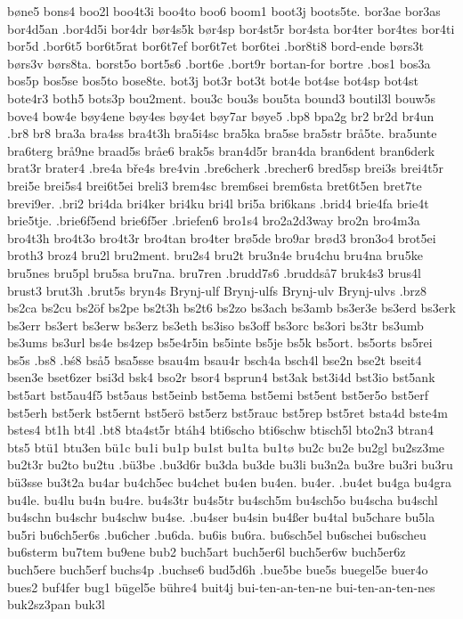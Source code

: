 bøne5
bons4
boo2l
boo4t3i
boo4to
boo6
boom1
boot3j
boots5te.
bor3ae
bor3as
bor4d5an
.bor4d5i
bor4dr
bør4s5k
bør4sp
bor4st5r
bor4sta
bor4ter
bor4tes
bor4ti
bor5d
.bor6t5
bor6t5rat
bor6t7ef
bor6t7et
bor6tei
.bor8ti8
bord-ende
børs3t
børs3v
børs8ta.
borst5o
bort5s6
.bort6e
.bort9r
bortan-for
bortre
.bos1
bos3a
bos5p
bos5se
bos5to
bose8te.
bot3j
bot3r
bot3t
bot4e
bot4se
bot4sp
bot4st
bote4r3
both5
bots3p
bou2ment.
bou3c
bou3s
bou5ta
bound3
boutil3l
bouw5s
bove4
bow4e
bøy4ene
bøy4es
bøy4et
bøy7ar
bøye5
.bp8
bpa2g
br2
br2d
br4un
.br8
br8
bra3a
bra4ss
bra4t3h
bra5i4sc
bra5ka
bra5se
bra5str
brå5te.
bra5unte
bra6terg
brå9ne
braad5s
bråe6
brak5s
bran4d5r
bran4da
bran6dent
bran6derk
brat3r
brater4
.bre4a
bře4s
bre4vin
.bre6cherk
.brecher6
bred5sp
brei3s
brei4t5r
brei5e
brei5s4
brei6t5ei
breli3
brem4sc
brem6sei
brem6sta
bret6t5en
bret7te
brevi9er.
.bri2
bri4da
bri4ker
bri4ku
bri4l
bri5a
bri6kans
.brid4
brie4fa
brie4t
brie5tje.
.brie6f5end
brie6f5er
.briefen6
bro1s4
bro2a2d3way
bro2n
bro4m3a
bro4t3h
bro4t3o
bro4t3r
bro4tan
bro4ter
brø5de
bro9ar
brød3
bron3o4
brot5ei
broth3
broz4
bru2l
bru2ment.
bru2s4
bru2t
bru3n4e
bru4chu
bru4na
bru5ke
bru5nes
bru5pl
bru5sa
bru7na.
bru7ren
.brudd7s6
.bruddså7
bruk4s3
brus4l
brust3
brut3h
.brut5s
bryn4s
Brynj-ulf
Brynj-ulfs
Brynj-ulv
Brynj-ulvs
.brz8
bs2ca
bs2cu
bs2öf
bs2pe
bs2t3h
bs2t6
bs2zo
bs3ach
bs3amb
bs3er3e
bs3erd
bs3erk
bs3err
bs3ert
bs3erw
bs3erz
bs3eth
bs3iso
bs3off
bs3orc
bs3ori
bs3tr
bs3umb
bs3ums
bs3url
bs4e
bs4zep
bs5e4r5in
bs5inte
bs5je
bs5k
bs5ort.
bs5orts
bs5rei
bs5s
.bs8
.bś8
bså5
bsa5sse
bsau4m
bsau4r
bsch4a
bsch4l
bse2n
bse2t
bseit4
bsen3e
bset6zer
bsi3d
bsk4
bso2r
bsor4
bsprun4
bst3ak
bst3i4d
bst3io
bst5ank
bst5art
bst5au4f5
bst5aus
bst5einb
bst5ema
bst5emi
bst5ent
bst5er5o
bst5erf
bst5erh
bst5erk
bst5ernt
bst5erö
bst5erz
bst5rauc
bst5rep
bst5ret
bsta4d
bste4m
bstes4
bt1h
bt4l
.bt8
bta4st5r
btáh4
bti6scho
bti6schw
btisch5l
bto2n3
btran4
bts5
btü1
btu3en
bü1c
bu1i
bu1p
bu1st
bu1ta
bu1tø
bu2c
bu2e
bu2gl
bu2sz3me
bu2t3r
bu2to
bu2tu
.bü3be
.bu3d6r
bu3da
bu3de
bu3li
bu3n2a
bu3re
bu3ri
bu3ru
bü3sse
bu3t2a
bu4ar
bu4ch5ec
bu4chet
bu4en
bu4en.
bu4er.
.bu4et
bu4ga
bu4gra
bu4le.
bu4lu
bu4n
bu4re.
bu4s3tr
bu4s5tr
bu4sch5m
bu4sch5o
bu4scha
bu4schl
bu4schn
bu4schr
bu4schw
bu4se.
.bu4ser
bu4sin
bu4ßer
bu4tal
bu5chare
bu5la
bu5ri
bu6ch5er6s
.bu6cher
.bu6da.
bu6is
bu6ra.
bu6sch5el
bu6schei
bu6scheu
bu6sterm
bu7tem
bu9ene
bub2
buch5art
buch5er6l
buch5er6w
buch5er6z
buch5ere
buch5erf
buchs4p
.buchse6
bud5d6h
.bue5be
bue5s
buegel5e
buer4o
bues2
buf4fer
bug1
bügel5e
bühre4
buit4j
bui-ten-an-ten-ne
bui-ten-an-ten-nes
buk2sz3pan
buk3l
